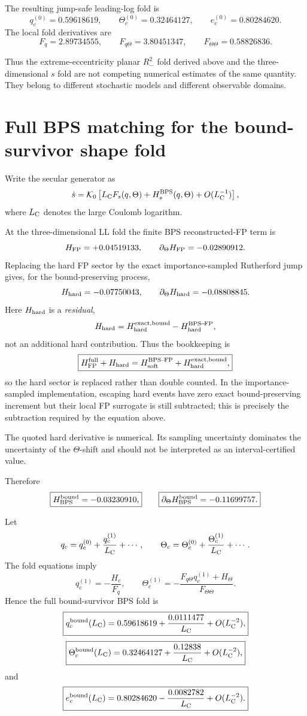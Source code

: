 \documentclass[11pt]{article}
\theoremstyle{remark}
\newcommand{\1}{\mathbf 1}
\begin{document}
The resulting jump-safe leading-log fold is
\[
\boxed{
q_c^{(0)}=0.59618619,
\qquad
\Theta_c^{(0)}=0.32464127,
\qquad
e_c^{(0)}=0.80284620.
}
\]
The local fold derivatives are
\[
F_q=2.89734555,
\qquad
F_{q\Theta}=3.80451347,
\qquad
F_{\Theta\Theta}=0.58826836.
\]

Thus the extreme-eccentricity planar $R_-^2$ fold derived above and the
three-dimensional $s$ fold are not competing numerical estimates of the same
quantity.  They belong to different stochastic models and different
observable domains.

\section{Full BPS matching for the bound-survivor shape fold}

Write the secular generator as
\[
\dot s
=
\mathcal K_0
\left[
L_{\rm C}F_s(q,\Theta)
+
H_s^{\rm BPS}(q,\Theta)
+
O(L_{\rm C}^{-1})
\right],
\]
where $L_{\rm C}$ denotes the large Coulomb logarithm.

At the three-dimensional LL fold the finite BPS reconstructed-FP term is
\[
H_{\rm FP}=+0.04519133,
\qquad
\partial_\Theta H_{\rm FP}=-0.02890912.
\]
Replacing the hard FP sector by the exact importance-sampled Rutherford jump
gives, for the bound-preserving process,
\[
H_{\rm hard}=-0.07750043,
\qquad
\partial_\Theta H_{\rm hard}=-0.08808845.
\]
Here $H_{\rm hard}$ is a \emph{residual},
\[
H_{\rm hard}
=
H_{\rm hard}^{\rm exact,bound}
-
H_{\rm hard}^{\rm BPS\!-\!FP},
\]
not an additional hard contribution.  Thus the bookkeeping is
\[
\boxed{
H_{\rm FP}^{\rm full}+H_{\rm hard}
=
H_{\rm soft}^{\rm BPS\!-\!FP}
+
H_{\rm hard}^{\rm exact,bound},
}
\]
so the hard sector is replaced rather than double counted.  In the
importance-sampled implementation, escaping hard events have zero exact
bound-preserving increment but their local FP surrogate is still subtracted;
this is precisely the subtraction required by the equation above.

The quoted hard derivative is numerical.  Its sampling uncertainty dominates
the uncertainty of the $\Theta$-shift and should not be interpreted as an
interval-certified value.

Therefore
\[
\boxed{
H_{\rm BPS}^{\rm bound}
=
-0.03230910,
}
\qquad
\boxed{
\partial_\Theta H_{\rm BPS}^{\rm bound}
=
-0.11699757.
}
\]

Let
\[
q_c=q_c^{(0)}+\frac{q_c^{(1)}}{L_{\rm C}}+\cdots,
\qquad
\Theta_c=\Theta_c^{(0)}+\frac{\Theta_c^{(1)}}{L_{\rm C}}+\cdots.
\]
The fold equations imply
\[
q_c^{(1)}=-\frac{H_c}{F_q},
\qquad
\Theta_c^{(1)}
=
-\frac{F_{q\Theta}q_c^{(1)}+H_\Theta}{F_{\Theta\Theta}}.
\]
Hence the full bound-survivor BPS fold is
\[
\boxed{
q_c^{\rm bound}(L_{\rm C})
=
0.59618619+\frac{0.0111477}{L_{\rm C}}+O(L_{\rm C}^{-2}),
}
\]
\[
\boxed{
\Theta_c^{\rm bound}(L_{\rm C})
=
0.32464127+\frac{0.12838}{L_{\rm C}}+O(L_{\rm C}^{-2}),
}
\]
and
\[
\boxed{
e_c^{\rm bound}(L_{\rm C})
=
0.80284620-\frac{0.0082782}{L_{\rm C}}+O(L_{\rm C}^{-2}).
}
\]
\end{document}
